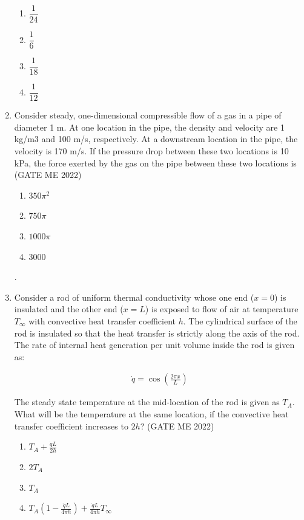 \documentclass[journal]{IEEEtran}
\numberwithin{equation}{enumi}
\numberwithin{figure}{enumi}
\begin{document}
\begin{enumerate}
\begin{enumerate}
    \item $\dfrac{1}{24}$
    
    \item $\dfrac{1}{6}$
    
    \item $\dfrac{1}{18}$
    
    \item $\dfrac{1}{12}$
\end{enumerate}
\item Consider steady, one-dimensional compressible flow of a gas in a pipe of diameter 1 m. At one location in the pipe, the density and velocity are 1 kg/m3 and 100 m/s, respectively. At a downstream location in the pipe, the velocity is 170 m/s. If the pressure drop between these two locations is 10 kPa, the force exerted by the gas
on the pipe between these two locations is
\hfill{(GATE ME 2022)}
\begin{multicols}{4}
\begin{enumerate}
    \item $350\pi^2$
    \item $750\pi$
    \item $1000\pi$
    \item 3000
\end{enumerate}.
\end{multicols}
\item Consider a rod of uniform thermal conductivity whose one end (\(x = 0\)) is insulated and the other end (\(x = L\)) is exposed to flow of air at temperature \(T_{\infty}\) with convective heat transfer coefficient \(h\). The cylindrical surface of the rod is insulated so that the heat transfer is strictly along the axis of the rod. The rate of internal heat generation per unit volume inside the rod is given as:

\begin{align}
    \dot{q} = \cos\left(\frac{2\pi x}{L} \right)
\end{align}

The steady state temperature at the mid-location of the rod is given as \(T_A\). What will be the temperature at the same location, if the convective heat transfer coefficient increases to \(2h\)?
\hfill{(GATE ME 2022)}
\begin{enumerate}
    
 \item  $T_A + \frac{\dot{q}L}{2h} $
     \item $ 2T_A$ 
    \item $ T_A $
    \item $ T_A \left(1 - \frac{\dot{q}L}{4\pi h} \right) + \frac{\dot{q}L}{4\pi h} T_{\infty} $
\end{enumerate}


\end{enumerate}
\end{document}
